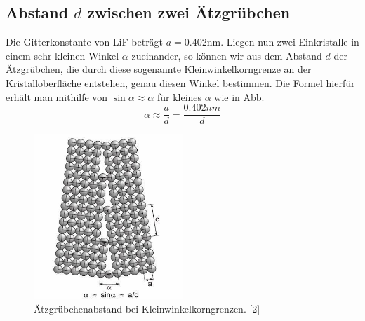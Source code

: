     \subsection{Abstand $d$ zwischen zwei Ätzgrübchen}

	Die Gitterkonstante von LiF beträgt $a = 0.402$nm. Liegen nun zwei Einkristalle in einem sehr kleinen Winkel $\alpha$ zueinander, so können wir aus dem Abstand $d$ der 
	Ätzgrübchen, die durch diese sogenannte Kleinwinkelkorngrenze an der Kristalloberfläche entstehen, genau diesen Winkel bestimmen. Die Formel hierfür erhält man mithilfe
	von $\sin{\alpha} \approx \alpha$ für kleines $\alpha$ wie in Abb. %
	\begin{equation}
		\alpha \approx \frac{a}{d} = \frac{0.402nm}{d}
	\end{equation}

	\begin{figure}[H]
            \centering
            \includegraphics[width=0.5\textwidth]{Images/Korn.JPG}
            \caption{Ätzgrübchenabstand bei Kleinwinkelkorngrenzen. [2]}
            \label{FigKorn}
        \end{figure}

